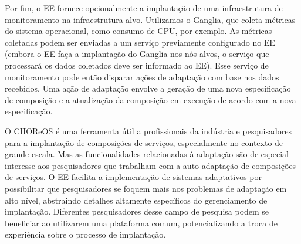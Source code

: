 \begin{description}
Por fim, o EE fornece opcionalmente a implantação de uma infraestrutura de monitoramento na infraestrutura alvo.
Utilizamos o Ganglia, que coleta métricas do sistema operacional, como consumo de CPU, por exemplo.
As métricas coletadas podem ser enviadas a um serviço previamente configurado no EE
(embora o EE faça a implantação do Ganglia nos nós alvos, o serviço que processará
os dados coletados deve ser informado ao EE).
Esse serviço de monitoramento pode então disparar ações de adaptação com base
nos dados recebidos. Uma ação de adaptação envolve a geração de uma nova especificação
de composição e a atualização da composição em execução de acordo com a nova especificação.

O CHOReOS \ee é uma ferramenta útil a profissionais da indústria e pesquisadores para
a implantação de composições de serviços, especialmente no contexto de grande escala.
Mas as funcionalidades relacionadas à adaptação são de especial interesse
aos pesquisadores que trabalham com a auto-adaptação de composições de serviços.
O EE facilita a implementação de sistemas adaptativos
por possibilitar que pesquisadores se foquem mais nos problemas de adaptação em
alto nível, abstraindo detalhes altamente específicos do gerenciamento de implantação.
Diferentes pesquisadores desse campo de pesquisa podem se beneficiar ao utilizarem uma plataforma comum,
potencializando a troca de experiência sobre o processo de implantação. 

\end{description}


